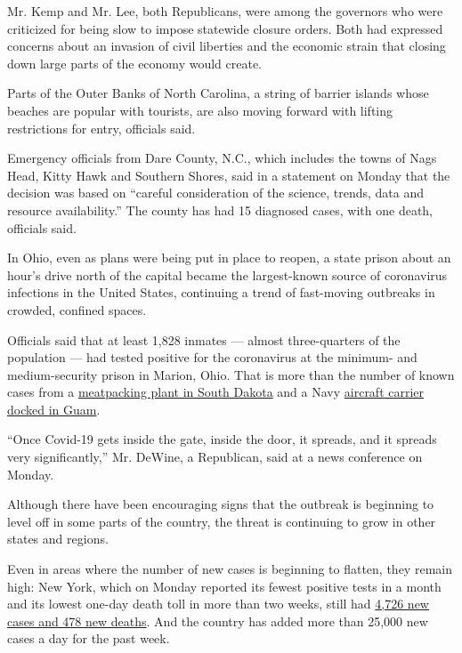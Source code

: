 Mr. Kemp and Mr. Lee, both Republicans, were among the governors who
were criticized for being slow to impose statewide closure orders. Both
had expressed concerns about an invasion of civil liberties and the
economic strain that closing down large parts of the economy would
create.

Parts of the Outer Banks of North Carolina, a string of barrier islands
whose beaches are popular with tourists, are also moving forward with
lifting restrictions for entry, officials said.

Emergency officials from Dare County, N.C., which includes the towns of
Nags Head, Kitty Hawk and Southern Shores, said in a statement on Monday
that the decision was based on ``careful consideration of the science,
trends, data and resource availability.'' The county has had 15
diagnosed cases, with one death, officials said.

In Ohio, even as plans were being put in place to reopen, a state prison
about an hour's drive north of the capital became the largest-known
source of coronavirus infections in the United States, continuing a
trend of fast-moving outbreaks in crowded, confined spaces.

Officials said that at least 1,828 inmates --- almost three-quarters of
the population --- had tested positive for the coronavirus at the
minimum- and medium-security prison in Marion, Ohio. That is more than
the number of known cases from a
\href{https://www.nytimes.com/2020/04/15/us/coronavirus-south-dakota-meat-plant-refugees.html}{meatpacking
plant in South Dakota} and a Navy
\href{https://www.nytimes.com/2020/04/06/us/politics/coronavirus-navy-secretary-roosevelt-crozier.html}{aircraft
carrier docked in Guam}.

``Once Covid-19 gets inside the gate, inside the door, it spreads, and
it spreads very significantly,'' Mr. DeWine, a Republican, said at a
news conference on Monday.

Although there have been encouraging signs that the outbreak is
beginning to level off in some parts of the country, the threat is
continuing to grow in other states and regions.

Even in areas where the number of new cases is beginning to flatten,
they remain high: New York, which on Monday reported its fewest positive
tests in a month and its lowest one-day death toll in more than two
weeks, still had
\href{https://www.nytimes.com/2020/04/20/nyregion/coronavirus-new-york-update.html?type=styln-live-updates\&label=new\%20york\&index=2\&action=click\&module=Spotlight\&pgtype=Homepage}{4,726
new cases and 478 new deaths}. And the country has added more than
25,000 new cases a day for the past week.

